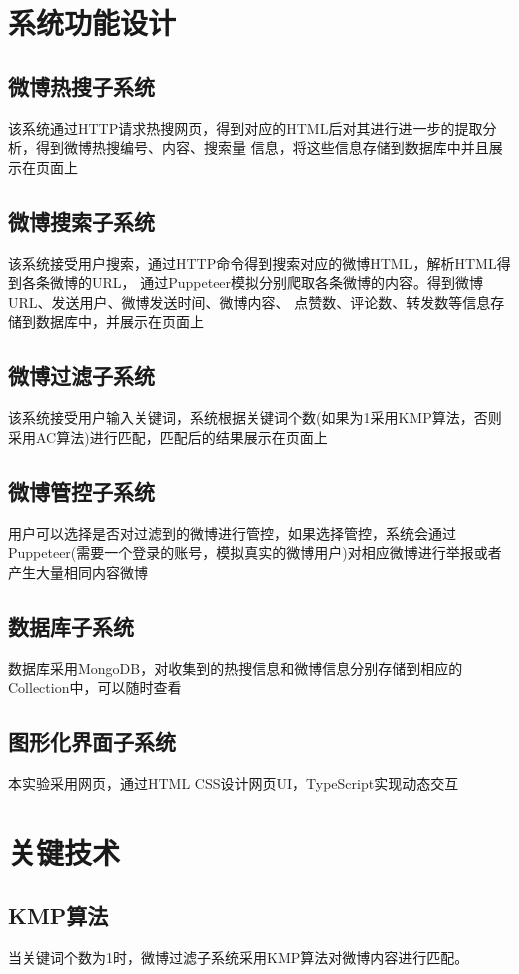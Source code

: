 \documentclass{ctexart}
\begin{document}
\section{系统功能设计}

\subsection{微博热搜子系统}
该系统通过HTTP请求热搜网页，得到对应的HTML后对其进行进一步的提取分析，得到微博热搜编号、内容、搜索量
信息，将这些信息存储到数据库中并且展示在页面上
\subsection{微博搜索子系统}
该系统接受用户搜索，通过HTTP命令得到搜索对应的微博HTML，解析HTML得到各条微博的URL，
通过Puppeteer模拟分别爬取各条微博的内容。得到微博URL、发送用户、微博发送时间、微博内容、
点赞数、评论数、转发数等信息存储到数据库中，并展示在页面上
\subsection{微博过滤子系统}
该系统接受用户输入关键词，系统根据关键词个数(如果为1采用KMP算法，否则采用AC算法)进行匹配，匹配后的结果展示在页面上
\subsection{微博管控子系统}
用户可以选择是否对过滤到的微博进行管控，如果选择管控，系统会通过Puppeteer(需要一个登录的账号，模拟真实的微博用户)对相应微博进行举报或者产生大量相同内容微博
\subsection{数据库子系统}
数据库采用MongoDB，对收集到的热搜信息和微博信息分别存储到相应的Collection中，可以随时查看
\subsection{图形化界面子系统}
本实验采用网页，通过HTML CSS设计网页UI，TypeScript实现动态交互

\section{关键技术}
\subsection{KMP算法}
当关键词个数为1时，微博过滤子系统采用KMP算法对微博内容进行匹配。
\end{document}
